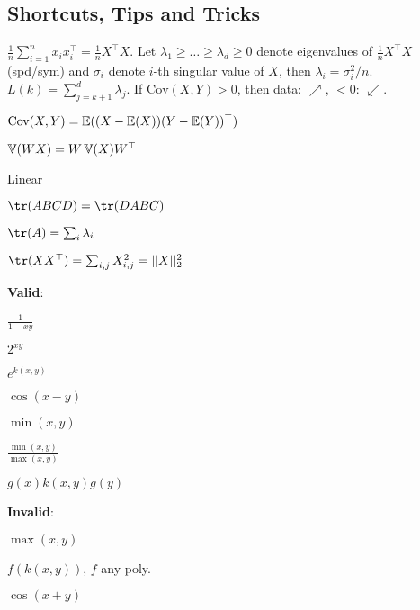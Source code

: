 \subsection{Shortcuts, Tips and Tricks}
\begin{definition}
  \(\frac{1}{n}\sum_{i = 1}^n x_i x_i^\top = \frac{1}{n}X^\top X\). Let \(\lambda_1 \geq \ldots \geq \lambda_d \geq 0\) denote eigenvalues of \(\frac{1}{n}X^\top X\) (spd/sym) and \(\sigma_i\) denote \(i\)-th singular value of \(X\), then \(\lambda_i = \sigma_i^2/n\). \(L(k) = \sum_{j=k+1}^d \lambda_j\).
  If \(\text{Cov}(X, Y) > 0\), then data: \(\nearrow\), \(< 0\): \(\swarrow\).
  
  \(\text{Cov}(X, Y) = \operatorname{\mathbb{E}}((X - \operatorname{\mathbb{E}}(X))(Y - \operatorname{\mathbb{E}}(Y))^\top)\)

  \(\operatorname{\mathbb{V}}(WX) = W \operatorname{\mathbb{V}}(X) W^\top\)
\end{definition}

\begin{definition}[Trace \(\tr\)]
  \begin{itemize*}
    \item Linear
    \item \(\tr(A B C D) = \tr(D A B C)\)
    \item \(\tr(A) = \sum_i \lambda_i\)
    \item \(\tr(XX^\top) = \sum_{i, j} X_{i, j}^2 = ||X||_2^2\)
  \end{itemize*}
\end{definition}

\begin{definition}[Kernels]
  \textbf{Valid}:
  \begin{itemize*}
    \item \(\frac{1}{1 - xy}\)
    \item \(2^{xy}\)
    \item \(e^{k(x, y)}\)
    \item \(\cos(x - y)\) \\
    \item \(\min(x, y)\)
    \item \(\frac{\min(x, y)}{\max(x, y)}\)
    \item \(g(x)k(x, y) g(y)\)
  \end{itemize*}
  \textbf{Invalid}: {\color{red}
  \begin{itemize*}
    \item \(\max(x, y)\)
    \item \(f(k(x, y))\), \(f\) any poly.
    \item \(\cos(x + y)\)
  \end{itemize*}}
\end{definition}

